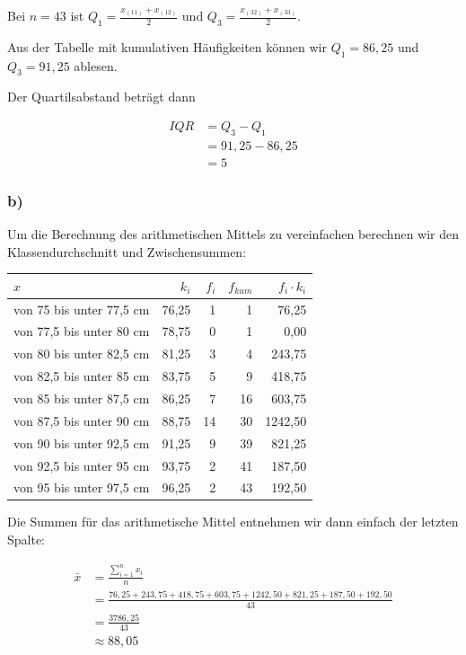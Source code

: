 \documentclass[
  11pt,
  ngerman,
  a4paper,
]{report}
\begin{document}
Bei \(n=43\) ist \(Q_1=\frac{x_{(11)}+x_{(12)}}{2}\) und \(Q_3=\frac{x_{(32)}+x_{(33)}}{2}\).

Aus der Tabelle mit kumulativen Häufigkeiten können wir \(Q_1=86{,}25\) und \(Q_3=91{,}25\) ablesen.

Der Quartilsabstand beträgt dann

\[\begin{aligned}
\mathit{IQR}&=Q_3-Q_1\\
            &=91{,}25-86{,}25\\
            &=5
\end{aligned}\]

\hypertarget{b-5}{%
\subsubsection{b)}\label{b-5}}

Um die Berechnung des arithmetischen Mittels zu vereinfachen berechnen wir den Klassendurchschnitt und Zwischensummen:

\begin{table}[H]
\centering
\begin{tabular}{lrrrr}
\toprule
$x$ & $k_i$ & $f_i$ & $f_{kum}$ & $f_i \cdot k_i$\\
\midrule
von 75 bis unter 77,5 cm & 76,25 & 1 & 1 & 76,25\\
von 77,5 bis unter 80 cm & 78,75 & 0 & 1 & 0,00\\
von 80 bis unter 82,5 cm & 81,25 & 3 & 4 & 243,75\\
von 82,5 bis unter 85 cm & 83,75 & 5 & 9 & 418,75\\
von 85 bis unter 87,5 cm & 86,25 & 7 & 16 & 603,75\\
von 87,5 bis unter 90 cm & 88,75 & 14 & 30 & 1242,50\\
von 90 bis unter 92,5 cm & 91,25 & 9 & 39 & 821,25\\
von 92,5 bis unter 95 cm & 93,75 & 2 & 41 & 187,50\\
von 95 bis unter 97,5 cm & 96,25 & 2 & 43 & 192,50\\
\bottomrule
\end{tabular}
\end{table}

Die Summen für das arithmetische Mittel entnehmen wir dann einfach der letzten Spalte:

\[\begin{aligned}
  \bar{x}&=\frac{\sum\limits_{i=1}^nx_i}{n} \\
         &=\frac{76{,}25+ 243{,}75+ 418{,}75+ 603{,}75+1242{,}50+ 821{,}25+ 187{,}50+ 192{,}50}{43} \\
         &=\frac{3786{,}25}{43} \\
         &\approx88{,}05
\end{aligned}\]
\end{document}
